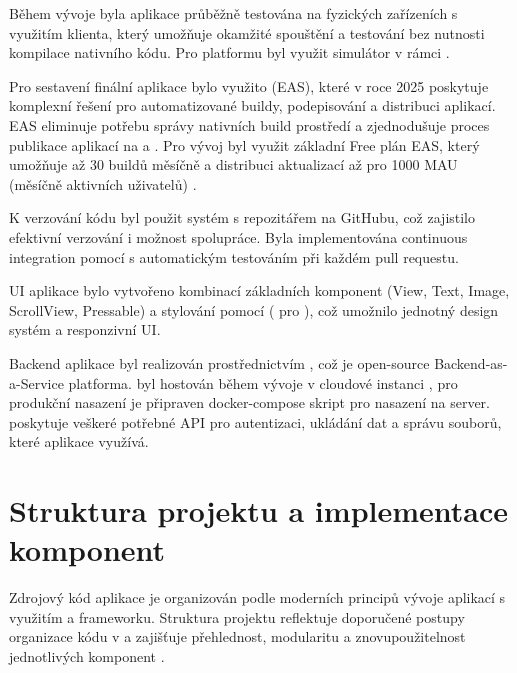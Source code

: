 \documentclass[czech, bp, kiv, he, iso690numb, pdf]{fasthesis}
\begin{document}
    Během vývoje byla aplikace průběžně testována na fyzických zařízeních s využitím  klienta, který umožňuje okamžité spouštění a testování bez nutnosti kompilace nativního kódu. Pro  platformu byl využit simulátor v rámci .

    Pro sestavení finální aplikace bylo využito  (EAS), které v roce 2025 poskytuje komplexní řešení pro automatizované buildy, podepisování a distribuci  aplikací. EAS eliminuje potřebu správy nativních build prostředí a zjednodušuje proces publikace aplikací na  a . Pro vývoj byl využit základní Free plán EAS, který umožňuje až 30 buildů měsíčně a distribuci aktualizací až pro 1000 MAU (měsíčně aktivních uživatelů) \cite{expoPricing}.

    K verzování kódu byl použit systém  s repozitářem na GitHubu, což zajistilo efektivní verzování i možnost spolupráce. Byla implementována continuous integration pomocí  s automatickým testováním při každém pull requestu.

    UI aplikace bylo vytvořeno kombinací základních  komponent (View, Text, Image, ScrollView, Pressable) a stylování pomocí  ( \cite{tailwindcss} pro ), což umožnilo jednotný design systém a responzivní UI.

    Backend aplikace byl realizován prostřednictvím , což je open-source Backend-as-a-Service platforma.  byl hostován během vývoje v cloudové instanci , pro produkční nasazení je připraven docker-compose skript pro nasazení na server.  poskytuje veškeré potřebné API pro autentizaci, ukládání dat a správu souborů, které aplikace využívá. \cite{appwrite}



    \section{Struktura projektu a implementace komponent}

    Zdrojový kód aplikace je organizován podle moderních principů vývoje  aplikací s využitím  a  frameworku. Struktura projektu reflektuje doporučené postupy organizace kódu v  a zajišťuje přehlednost, modularitu a znovupoužitelnost jednotlivých komponent \cite{expo2025}.
\end{document}
